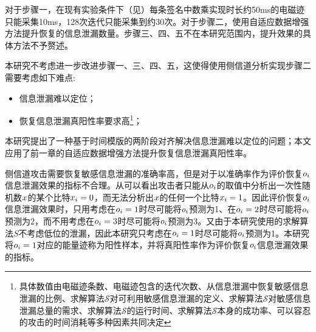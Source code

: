 {	对于步骤一，在现有实验条件下（见）每条签名中数乘实现时长约50ms的电磁迹只能采集10ms，128次迭代只能采集到约30次。对于步骤二，使用自适应数据增强方法提升恢复的信息泄漏数量。步骤三、四、五不在本研究范围内，提升效果的具体方法不予赘述。
	
	本研究不考虑进一步改进步骤一、三、四、五，这使得使用侧信道分析实现步骤二需要考虑如下难点:
	
	\begin{itemize}
		\item 信息泄漏难以定位；
		\item 恢复信息泄漏真阳性率要求高\footnote{具体数值由电磁迹条数、电磁迹包含的迭代次数、从信息泄漏中恢复敏感信息泄漏的比例、求解算法$\mathcal S$对可利用敏感信息泄漏的定义、求解算法$\mathcal S$对敏感信息泄漏总量的需求、求解算法$\mathcal S$的运行时间、求解算法$\mathcal S$本身的成功率、可以容忍的攻击的时间消耗等多种因素共同决定}；
	\end{itemize}

	本研究提出了一种基于时间模版的两阶段对齐解决信息泄漏难以定位的问题；本文应用了前一章的自适应数据增强方法提升恢复信息泄漏真阳性率。
	
	侧信道攻击需要恢复敏感信息泄漏的准确率高，但是对于以准确率作为评价恢复$o_i$信息泄漏效果的指标不合理。从可以看出攻击者只能从$o_i$的取值中分析出一次性随机数$x$的某个比特$x_i=0$，而无法分析出$x$的任何一个比特$x_i=1$。因此评价恢复$o_i$信息泄漏效果时，只用考虑在$o_i=1$时尽可能将$o_i$预测为1、在$o_i=2$时尽可能将$o_i$预测为2，而不用考虑在$o_i=3$时尽可能将$o_i$预测为3。又由于本研究使用的求解算法$S$不考虑低位的泄漏，因此本研究只考虑在$o_i=1$时尽可能将$o_i$预测为1。本研究将$o_i=1$对应的能量迹称为阳性样本，并将真阳性率作为评价恢复$o_i$信息泄漏效果的指标。
	
}
